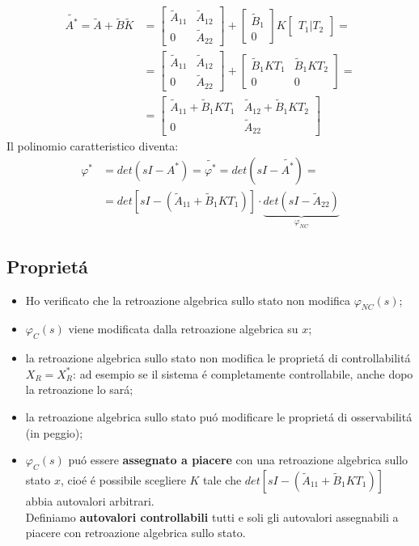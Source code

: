 \documentclass[../main.tex]{subfiles}
\begin{document}
		\begin{align*}
			\tilde{A^{*}} = \tilde A + \tilde B \tilde K &=
			\begin{bmatrix}
				\tilde A_{11} & \tilde A_{12}\\
				0 & \tilde A_{22}
			\end{bmatrix} +
			\begin{bmatrix}
				\tilde B_{1}\\
				0
			\end{bmatrix} K
			\begin{bmatrix}
				T_1 | T_2
			\end{bmatrix}=
			\\
			&= \begin{bmatrix}
				\tilde A_{11} & \tilde A_{12}\\
				0 & \tilde A_{22}
			\end{bmatrix} +
			\begin{bmatrix}
				\tilde B_1 K T_1 & \tilde B_1 K T_2\\
				0 & 0
			\end{bmatrix}=
			\\
			&= \begin{bmatrix}
				\tilde A_{11} + \tilde B_1 K T_1 & \tilde A_{12} + \tilde B_1 K T_2\\
				0 & \tilde A_{22}
			\end{bmatrix}
		\end{align*}
		Il polinomio caratteristico diventa:
		\begin{align*}
			\varphi^{*} &= det(sI-A^{*}) = \tilde{\varphi^{*}} = det(sI-\tilde{A^{*}}) =\\
			&= det\left[ sI - (\tilde A_{11} + \tilde B_1 K T_1) \right] \cdot \underbrace{det(sI - \tilde A_{22})}_{\varphi_{NC}}
		\end{align*}
		
	\subsection{Propriet\'a}
		\begin{itemize}
			\item
				Ho verificato che la retroazione algebrica sullo stato non modifica $ \varphi_{NC}(s) $;
			\item
				$ \varphi_C(s) $ viene modificata dalla retroazione algebrica su $ x $;
			\item 
				la retroazione algebrica sullo stato non modifica le propriet\'a di controllabilit\'a $ X_R = X_R^{*} $: ad esempio se il sistema \'e completamente controllabile, anche dopo la retroazione lo sar\'a;
			\item 
				la retroazione algebrica sullo stato pu\'o modificare le propriet\'a di osservabilit\'a (in peggio);
			\item
				$ \varphi_C(s) $ pu\'o essere \textbf{assegnato a piacere} con una retroazione algebrica sullo stato $ x $, cio\'e \'e possibile scegliere $ K $ tale che $ det\left[ sI - (\tilde A_{11} + \tilde B_1 K T_1) \right] $ abbia autovalori arbitrari.\\
				Definiamo \textbf{autovalori controllabili} tutti e soli gli autovalori assegnabili a piacere con retroazione algebrica sullo stato.
		\end{itemize}
	
\end{document}
